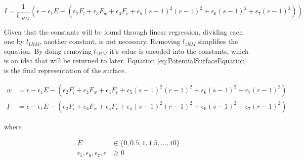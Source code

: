 \begin{equation*}
	I=\frac{1}{l_{1RM}}\left( 
		\epsilon-\epsilon_1 E-\left( 
			\epsilon_2 F_l+\epsilon_3 F_w+\epsilon_4 F_e+\epsilon_5 (s-1)^2(r-1)^2+\epsilon_6 (s-1)^2+\epsilon_7 (r-1)^2
		\right)
	\right)
\end{equation*}

Given that the constants will be found through linear regression, dividing each one by $l_{1RM}$, another constant, is not necessary. Removing $l_{1RM}$ simplifies the equation. By doing removing $l_{1RM}$ it's value is encoded into the constants, which is an idea that will be returned to later. Equation \ref{eq:PotentialSurfaceEquation} is the final representation of the surface.

\begin{equation}
	\label{eq:PotentialSurfaceEquation}
	\begin{split}
		w & =\epsilon-\epsilon_1 E-\left( 
			\epsilon_2 F_l+\epsilon_3 F_w+\epsilon_4 F_e+\epsilon_5 (s-1)^2(r-1)^2+\epsilon_6 (s-1)^2+\epsilon_7 (r-1)^2
		\right) \\
		I & =\epsilon-\epsilon_1 E-\left( 
			\epsilon_2 F_l+\epsilon_3 F_w+\epsilon_4 F_e+\epsilon_5 (s-1)^2(r-1)^2+\epsilon_6 (s-1)^2+\epsilon_7 (r-1)^2
		\right)
	\end{split}
\end{equation}
\centerline{where}
\begin{equation*}
    \begin{split}
        E & \in \{ 0,0.5,1,1.5,...,10 \} \\
        \epsilon_5,\epsilon_6,\epsilon_7,\epsilon & \ge 0 \\
    \end{split}
\end{equation*}






